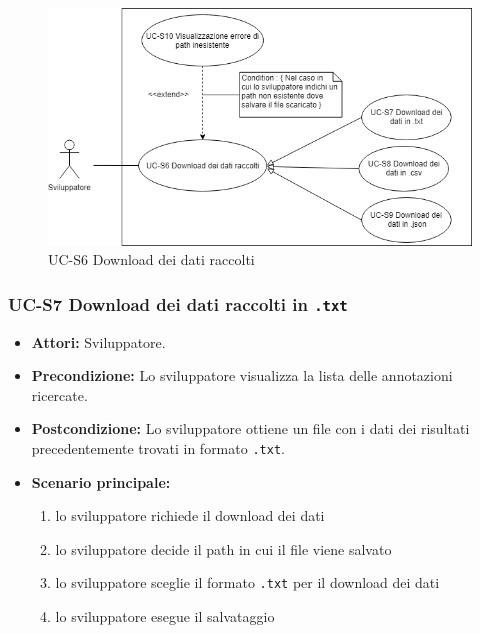 		\begin{figure}[h]
		\centering
		\includegraphics[scale=0.7]{images/UC-S6.png}
		\caption{UC-S6 Download dei dati raccolti}
	\end{figure}
	
\subsubsection{UC-S7 Download dei dati raccolti in \texttt{.txt}}
		\begin{itemize}
			\item \textbf{Attori:} Sviluppatore.
			\item \textbf{Precondizione:} Lo sviluppatore visualizza la lista delle annotazioni ricercate.
			\item \textbf{Postcondizione:} Lo sviluppatore ottiene un file con i dati dei risultati precedentemente trovati in formato \texttt{.txt}.
			\item \textbf{Scenario principale:}
				\begin{enumerate}
					\item lo sviluppatore richiede il download dei dati
					\item lo sviluppatore decide il path in cui il file viene salvato
					\item lo sviluppatore sceglie il formato \texttt{.txt} per il download dei dati
					\item lo sviluppatore esegue il salvataggio
				\end{enumerate}
		\end{itemize}

